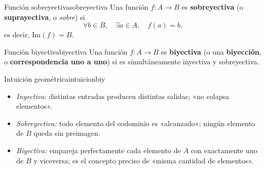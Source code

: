 \begin{definicion}{Función sobreyectiva}{sobreyectiva}
Una función $f: A \to B$ es \textbf{sobreyectiva} (o \textbf{suprayectiva}, o \emph{sobre}) si
\[
  \forall b \in B,\quad \exists a \in A,\quad f(a) = b,
\]
es decir, $\mathrm{Im}(f) = B$.
\end{definicion}

\begin{definicion}{Función biyectiva}{biyectiva}
Una función $f: A \to B$ es \textbf{biyectiva} (o una \textbf{biyección}, o \textbf{correspondencia uno a uno}) si es simultáneamente inyectiva y sobreyectiva.
\end{definicion}

\begin{observacion}{Intuición geométrica}{intuicionbiy}
\begin{itemize}[leftmargin=2em]
  \item \emph{Inyectiva:} distintas entradas producen distintas salidas; «no colapsa elementos».
  \item \emph{Sobreyectiva:} todo elemento del codominio es «alcanzado»; ningún elemento de $B$ queda sin preimagen.
  \item \emph{Biyectiva:} empareja perfectamente cada elemento de $A$ con exactamente uno de $B$ y viceversa; es el concepto preciso de «misma cantidad de elementos».
\end{itemize}
\end{observacion}

